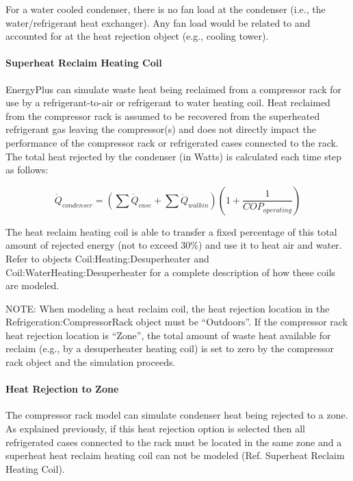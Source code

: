For a water cooled condenser, there is no fan load at the condenser (i.e., the~ water/refrigerant heat exchanger). Any fan load would be related to and accounted for at the heat rejection object (e.g., cooling tower).

\paragraph{Superheat Reclaim Heating Coil}\label{superheat-reclaim-heating-coil}

EnergyPlus can simulate waste heat being reclaimed from a compressor rack for use by a refrigerant-to-air or refrigerant to water heating coil. Heat reclaimed from the compressor rack is assumed to be recovered from the superheated refrigerant gas leaving the compressor(s) and does not directly impact the performance of the compressor rack or refrigerated cases connected to the rack. The total heat rejected by the condenser (in Watts) is calculated each time step as follows:

\begin{equation}
{\dot Q_{condenser}} = \left( {\sum {{{\dot Q}_{case}} + \left. {\sum {{{\dot Q}_{walkin}}} } \right)} } \right.\left( {1 + \left. {\frac{1}{{CO{P_{operating}}}}} \right)} \right.
\end{equation}

The heat reclaim heating coil is able to transfer a fixed percentage of this total amount of rejected energy (not to exceed 30\%) and use it to heat air and water. Refer to objects Coil:Heating:Desuperheater and Coil:WaterHeating:Desuperheater for a complete description of how these coils are modeled.

NOTE: When modeling a heat reclaim coil, the heat rejection location in the Refrigeration:CompressorRack object must be ``Outdoors''. If the compressor rack heat rejection location is ``Zone'', the total amount of waste heat available for reclaim (e.g., by a desuperheater heating coil) is set to zero by the compressor rack object and the simulation proceeds.

\paragraph{Heat Rejection to Zone}\label{heat-rejection-to-zone}

The compressor rack model can simulate condenser heat being rejected to a zone. As explained previously, if this heat rejection option is selected then all refrigerated cases connected to the rack must be located in the same zone and a superheat heat reclaim heating coil can not be modeled (Ref. Superheat Reclaim Heating Coil).


